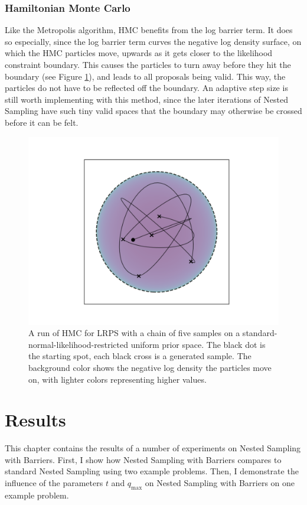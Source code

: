 \documentclass[12pt, a4paper]{report}
\begin{document}
\subsection{Hamiltonian Monte Carlo}
Like the Metropolis algorithm, HMC benefits from the log barrier term.
It does so especially, since the log barrier term curves the negative log density surface, on which the HMC particles move, upwards as it gets closer to the likelihood constraint boundary.
This causes the particles to turn away before they hit the boundary (see Figure \ref{fig:barrier_sampling_hmc}), and leads to all proposals being valid.
This way, the particles do not have to be reflected off the boundary.
An adaptive step size is still worth implementing with this method, since the later iterations of Nested Sampling have such tiny valid spaces that the boundary may otherwise be crossed before it can be felt.

\begin{figure}
    \centering
    \includegraphics[scale=0.8]{figs/barrier_sampling_hmc.png}
    \caption{A run of HMC for LRPS with a chain of five samples on a standard-normal-likelihood-restricted uniform prior space.
    The black dot is the starting spot, each black cross is a generated sample.
    The background color shows the negative log density the particles move on, with lighter colors representing higher values.}
    \label{fig:barrier_sampling_hmc}
\end{figure}



\FloatBarrier
\chapter{Results}
This chapter contains the results of a number of experiments on Nested Sampling with Barriers.
First, I show how Nested Sampling with Barriers compares to standard Nested Sampling using two example problems.
Then, I demonstrate the influence of the parameters $t$ and $q_{\textrm{max}}$ on Nested Sampling with Barriers on one example problem.
\end{document}
